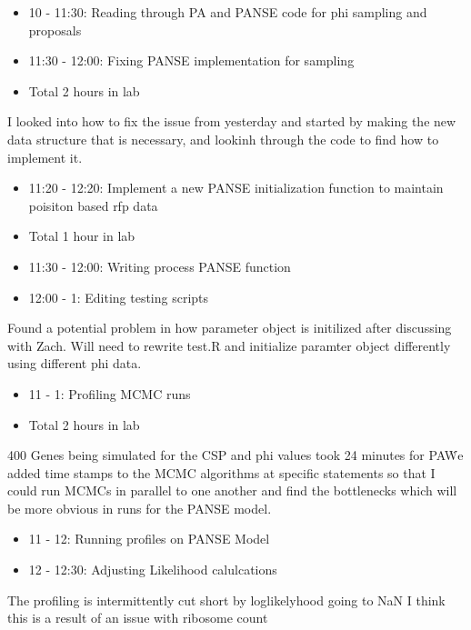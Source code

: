 \documentclass[12pt,hyperref]{labbook}
\begin{document}
\begin{itemize}
    \item 10 - 11:30: Reading through PA and PANSE code for phi sampling and proposals
    \item 11:30 - 12:00: Fixing PANSE implementation for sampling
    \item Total 2 hours in lab
\end{itemize}
I looked into how to fix the issue from yesterday and started by making the new data structure that is necessary,
and lookinh through the code to find how to implement it.
\begin{itemize}
    \item 11:20 - 12:20: Implement a new PANSE initialization function to maintain poisiton based rfp data
    \item Total 1 hour in lab
\end{itemize}
\begin{itemize}
    \item 11:30 - 12:00: Writing process PANSE function
    \item 12:00 - 1: Editing testing scripts
\end{itemize}
Found a potential problem in how parameter object is initilized after discussing with Zach. Will need to rewrite test.R and
initialize paramter object differently using different phi data.
\begin{itemize}
    \item 11 - 1: Profiling MCMC runs
    \item Total 2 hours in lab
\end{itemize}
400 Genes being simulated for the CSP and phi values took 24 minutes for PA\. We added time stamps to the MCMC algorithms
at specific statements so that I could run MCMCs in parallel to one another and find the bottlenecks which will be more obvious in runs for 
the PANSE model.
\begin{itemize}
    \item 11 - 12: Running profiles on PANSE Model
    \item 12 - 12:30: Adjusting Likelihood calulcations
\end{itemize}
The profiling is intermittently cut short by loglikelyhood going to NaN I think this is a result of an issue with ribosome count
\end{document}

